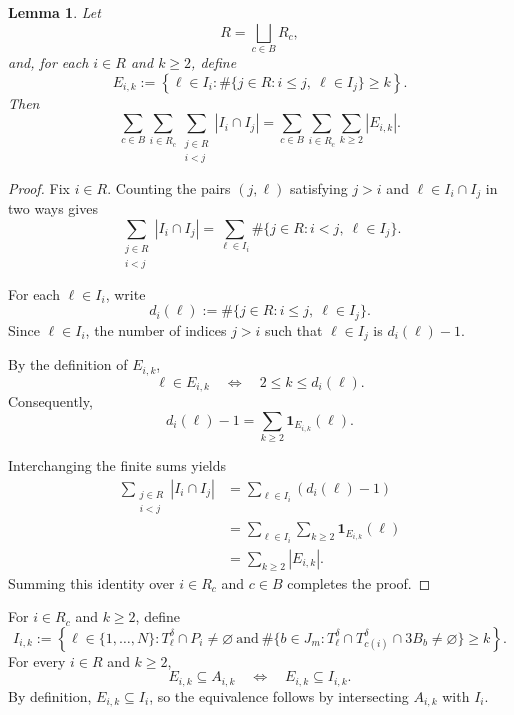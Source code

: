 \documentclass[11pt, letterpaper]{nyjm}
\newtheorem{lemma}[theorem]{Lemma}
\begin{document}
\begin{lemma}
	Let
	\[
	R=\bigsqcup_{c\in B}R_c,
	\]
	and, for each \(i\in R\) and \(k\ge2\), define
	\[
	E_{i,k}:=
	\left\{
	\ell\in I_i:
	\#\{j\in R:i\le j,\ \ell\in I_j\}\ge k
	\right\}.
	\]
	Then
	\[
	\sum_{c\in B}\sum_{i\in R_c}
	\sum_{\substack{j\in R\\i<j}}|I_i\cap I_j|
	=
	\sum_{c\in B}\sum_{i\in R_c}
	\sum_{k\ge2}|E_{i,k}|.
	\]
\end{lemma}

\begin{proof}
	Fix \(i\in R\). Counting the pairs
	\((j,\ell)\) satisfying \(j>i\) and
	\(\ell\in I_i\cap I_j\) in two ways gives
	\[
	\sum_{\substack{j\in R\\i<j}}|I_i\cap I_j|
	=
	\sum_{\ell\in I_i}
	\#\{j\in R:i<j,\ \ell\in I_j\}.
	\]
	
	For each \(\ell\in I_i\), write
	\[
	d_i(\ell):=
	\#\{j\in R:i\le j,\ \ell\in I_j\}.
	\]
	Since \(\ell\in I_i\), the number of indices
	\(j>i\) such that \(\ell\in I_j\) is
	\(d_i(\ell)-1\).
	
	By the definition of \(E_{i,k}\),
	\[
	\ell\in E_{i,k}
	\quad\Longleftrightarrow\quad
	2\le k\le d_i(\ell).
	\]
	Consequently,
	\[
	d_i(\ell)-1
	=
	\sum_{k\ge2}\mathbf{1}_{E_{i,k}}(\ell).
	\]
	
	Interchanging the finite sums yields
	\[
	\begin{aligned}
		\sum_{\substack{j\in R\\i<j}}|I_i\cap I_j|
		&=\sum_{\ell\in I_i}(d_i(\ell)-1)\\
		&=\sum_{\ell\in I_i}
		\sum_{k\ge2}\mathbf{1}_{E_{i,k}}(\ell)\\
		&=\sum_{k\ge2}|E_{i,k}|.
	\end{aligned}
	\]
	Summing this identity over \(i\in R_c\)
	and \(c\in B\) completes the proof.
\end{proof}
	For \(i\in R_c\) and \(k\ge 2\), define
\[
I_{i,k}:=
\left\{\ell\in\{1,\ldots,N\}:
T_\ell^\delta\cap P_i\ne\varnothing
\ \text{and}\
\#\{b\in J_m:T_\ell^\delta\cap T_{c(i)}^\delta\cap 3B_b\ne\varnothing\}\ge k
\right\}.
\]
For every \(i\in R\) and \(k\ge 2\),
\[
E_{i,k}\subseteq A_{i,k}
\quad\Longleftrightarrow\quad
E_{i,k}\subseteq I_{i,k}.
\]
By definition, \(E_{i,k}\subseteq I_{i}\), so the equivalence follows
by intersecting \(A_{i,k}\) with \(I_i\).
\end{document}
